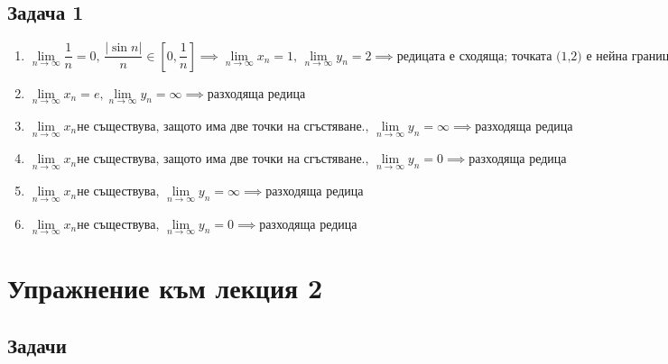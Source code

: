 \documentclass[a4paper,fleqn,12pt]{article}
\theoremstyle{definition}
\begin{document}
\subsection*{Задача 1}
\begin{enumerate}

\item $\lim\limits_{n \to \infty} \dfrac{1}{n} = 0, \, \dfrac{\vert \sin{n} \vert}{n} \in \left[0, \dfrac{1}{n} \right] \implies 
\lim\limits_{n \to \infty} x_n = 1, \, \lim\limits_{n \to \infty} y_n = 2 \implies 
\text{редицата е сходяща; точката (1,2) е нейна граница}$

\item $ \lim\limits_{n \to \infty} x_n = e , \lim\limits_{n \to \infty} y_n = \infty \implies 
\text{разходяща редица} $

\item $ \lim\limits_{n \to \infty} x_n \text{не съществува, защото има две точки на сгъстяване.}, \,  
\lim\limits_{n \to \infty} y_n = \infty \implies \text{разходяща редица}$

\item $\lim\limits_{n \to \infty} x_n \text{не съществува, защото има две точки на сгъстяване.}, \,  
\lim\limits_{n \to \infty} y_n = 0 \implies \text{разходяща редица}$

\item $\lim\limits_{n \to \infty} x_n \text{не съществува}, \,  
\lim\limits_{n \to \infty} y_n = \infty \implies \text{разходяща редица}$

\item $\lim\limits_{n \to \infty} x_n \text{не съществува}, \,  
\lim\limits_{n \to \infty} y_n = 0 \implies \text{разходяща редица}$
\end{enumerate}

\newpage
\section{Упражнение към лекция 2}

\subsection{Задачи}
\end{document}

